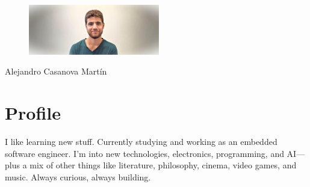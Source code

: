 \documentclass[10pt]{article} %
\begin{document}
\begin{paracol}{2} %


\parbox[top][0.15\textheight][c]{\linewidth}{ %
	\vspace{-0.055\textheight} %
	\centering %

	\begin{figure}[H]
		\includegraphics[width=0.51\textwidth]{pictures/foto_horizontal_3.jpg}
		\centering
	\end{figure}

	{\sffamily\Huge Alejandro Casanova Martín}\\\medskip %
}

\medskip %


\section{Profile}
I like learning new stuff. Currently studying and working as an embedded software engineer. I'm into new technologies, electronics, programming, and AI—plus a mix of other things like literature, philosophy, cinema, video games, and music. Always curious, always building.

\medskip %



\end{paracol}
\end{document}
